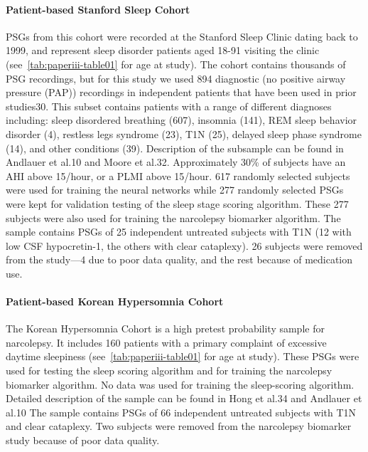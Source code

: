 \paragraph{Patient-based Stanford Sleep Cohort}
PSGs from this cohort were recorded at the Stanford Sleep Clinic dating back to 1999, and represent sleep disorder patients aged 18-91 visiting the clinic (see~\cref{tab:paperiii-table01} for age at study).
The cohort contains thousands of PSG recordings, but for this study we used 894 diagnostic (no positive airway pressure (PAP)) recordings in independent patients that have been used in prior studies30.
This subset contains patients with a range of different diagnoses including: sleep disordered breathing (607), insomnia (141), REM sleep behavior disorder (4), restless legs syndrome (23), T1N (25), delayed sleep phase syndrome (14), and other conditions (39).
Description of the subsample can be found in Andlauer et al.10 and Moore et al.32.
Approximately 30\% of subjects have an AHI above 15/hour, or a PLMI above 15/hour.
617 randomly selected subjects were used for training the neural networks while 277 randomly selected PSGs were kept for validation testing of the sleep stage scoring algorithm.
These 277 subjects were also used for training the narcolepsy biomarker algorithm.
The sample contains PSGs of 25 independent untreated subjects with T1N (12 with low CSF hypocretin-1, the others with clear cataplexy).
26 subjects were removed from the study—4 due to poor data quality, and the rest because of medication use.

\paragraph{Patient-based Korean Hypersomnia Cohort}
The Korean Hypersomnia Cohort is a high pretest probability sample for narcolepsy.
It includes 160 patients with a primary complaint of excessive daytime sleepiness (see~\cref{tab:paperiii-table01} for age at study).
These PSGs were used for testing the sleep scoring algorithm and for training the narcolepsy biomarker algorithm.
No data was used for training the sleep-scoring algorithm.
Detailed description of the sample can be found in Hong et al.34 and Andlauer et al.10
The sample contains PSGs of 66 independent untreated subjects with T1N and clear cataplexy.
Two subjects were removed from the narcolepsy biomarker study because of poor data quality.

